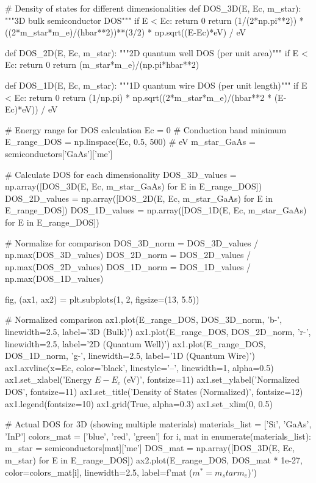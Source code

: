 \documentclass[11pt,a4paper]{article}
\begin{document}
\begin{pycode}
# Density of states for different dimensionalities
def DOS_3D(E, Ec, m_star):
    """3D bulk semiconductor DOS"""
    if E < Ec:
        return 0
    return (1/(2*np.pi**2)) * ((2*m_star*m_e)/(hbar**2))**(3/2) * np.sqrt((E-Ec)*eV) / eV

def DOS_2D(E, Ec, m_star):
    """2D quantum well DOS (per unit area)"""
    if E < Ec:
        return 0
    return (m_star*m_e)/(np.pi*hbar**2)

def DOS_1D(E, Ec, m_star):
    """1D quantum wire DOS (per unit length)"""
    if E < Ec:
        return 0
    return (1/np.pi) * np.sqrt((2*m_star*m_e)/(hbar**2 * (E-Ec)*eV)) / eV

# Energy range for DOS calculation
Ec = 0  # Conduction band minimum
E_range_DOS = np.linspace(Ec, 0.5, 500)  # eV
m_star_GaAs = semiconductors['GaAs']['me']

# Calculate DOS for each dimensionality
DOS_3D_values = np.array([DOS_3D(E, Ec, m_star_GaAs) for E in E_range_DOS])
DOS_2D_values = np.array([DOS_2D(E, Ec, m_star_GaAs) for E in E_range_DOS])
DOS_1D_values = np.array([DOS_1D(E, Ec, m_star_GaAs) for E in E_range_DOS])

# Normalize for comparison
DOS_3D_norm = DOS_3D_values / np.max(DOS_3D_values)
DOS_2D_norm = DOS_2D_values / np.max(DOS_2D_values)
DOS_1D_norm = DOS_1D_values / np.max(DOS_1D_values)

fig, (ax1, ax2) = plt.subplots(1, 2, figsize=(13, 5.5))

# Normalized comparison
ax1.plot(E_range_DOS, DOS_3D_norm, 'b-', linewidth=2.5, label='3D (Bulk)')
ax1.plot(E_range_DOS, DOS_2D_norm, 'r-', linewidth=2.5, label='2D (Quantum Well)')
ax1.plot(E_range_DOS, DOS_1D_norm, 'g-', linewidth=2.5, label='1D (Quantum Wire)')
ax1.axvline(x=Ec, color='black', linestyle='--', linewidth=1, alpha=0.5)
ax1.set_xlabel('Energy $E - E_c$ (eV)', fontsize=11)
ax1.set_ylabel('Normalized DOS', fontsize=11)
ax1.set_title('Density of States (Normalized)', fontsize=12)
ax1.legend(fontsize=10)
ax1.grid(True, alpha=0.3)
ax1.set_xlim(0, 0.5)

# Actual DOS for 3D (showing multiple materials)
materials_list = ['Si', 'GaAs', 'InP']
colors_mat = ['blue', 'red', 'green']
for i, mat in enumerate(materials_list):
    m_star = semiconductors[mat]['me']
    DOS_mat = np.array([DOS_3D(E, Ec, m_star) for E in E_range_DOS])
    ax2.plot(E_range_DOS, DOS_mat * 1e-27, color=colors_mat[i], linewidth=2.5,
             label=f'{mat} ($m^* = {m_star} m_e$)')


\end{pycode}
\end{document}
